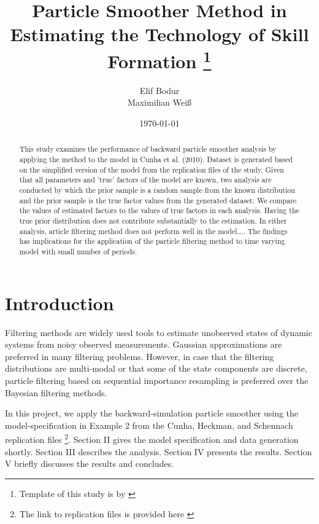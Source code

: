 \documentclass[11pt, a4paper, leqno]{article}
\begin{document}
\title{Particle Smoother Method in Estimating the Technology of Skill Formation  \thanks{Template of this study is by \citep{GaudeckerEconProjectTemplates}}}

\author{Elif Bodur \\ Maximilian Weiß}

\date{
\today
}

\maketitle


\begin{abstract}
	This study examines the performance of backward particle smoother analysis by applying the method to the model in Cunha et al. (2010). \nocite{cunha2010} Dataset is generated based on the simplified version of the model from the replication files of the study. Given that all parameters and 'true'  factors of the model are known, two analysis are conducted by which the prior sample is a random sample from the known distribution and the prior sample is the true factor values from the generated dataset. We compare the values of estimated factors to the values of true factors in each analysis. Having the true prior distribution does not contribute substantially to the estimation. In either analysis, article filtering method does not perform well in the model.... The findings has implications for the application of the particle filtering method to time varying model with small number of periods. 
\end{abstract}
\clearpage

\section{Introduction} %
\label{sec:introduction}

Filtering methods are widely used tools to estimate unobserved states of dynamic systems from noisy observed measurements. Gaussian approximations are preferred in many filtering problems. However, in case that the filtering distributions are multi-modal or that some of the state components are discrete, particle filtering based on sequential importance resampling is preferred over the Bayesian filtering methods\nocite{sarkka2013}. \par

In this project, we apply the backward-simulation particle smoother using the model-specification in Example 2 from the Cunha, Heckman, and Schennach replication files \footnote{The link to replication files is provided here \citep{chs_rep}}. Section II gives the model specification and data generation shortly. Section III describes the analysis. Section IV presents the results. Section V briefly discusses the results and concludes.
\end{document}
